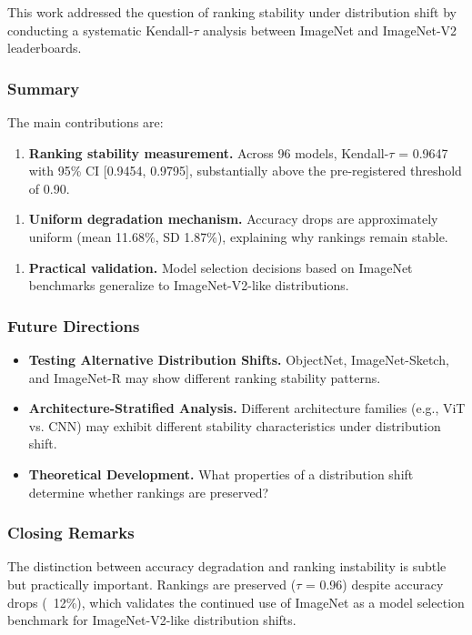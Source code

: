 
This work addressed the question of ranking stability under distribution shift by conducting a systematic Kendall-$\tau$ analysis between ImageNet and ImageNet-V2 leaderboards.

\subsubsection{Summary}

The main contributions are:

\begin{enumerate}
\item \textbf{Ranking stability measurement.} Across 96 models, Kendall-$\tau$ = 0.9647 with 95\% CI [0.9454, 0.9795], substantially above the pre-registered threshold of 0.90.
\end{enumerate}

\begin{enumerate}
\item \textbf{Uniform degradation mechanism.} Accuracy drops are approximately uniform (mean 11.68\%, SD 1.87\%), explaining why rankings remain stable.
\end{enumerate}

\begin{enumerate}
\item \textbf{Practical validation.} Model selection decisions based on ImageNet benchmarks generalize to ImageNet-V2-like distributions.
\end{enumerate}

\subsubsection{Future Directions}

\begin{itemize}
\item \textbf{Testing Alternative Distribution Shifts.} ObjectNet, ImageNet-Sketch, and ImageNet-R may show different ranking stability patterns.
\item \textbf{Architecture-Stratified Analysis.} Different architecture families (e.g., ViT vs. CNN) may exhibit different stability characteristics under distribution shift.
\item \textbf{Theoretical Development.} What properties of a distribution shift determine whether rankings are preserved?
\end{itemize}

\subsubsection{Closing Remarks}

The distinction between accuracy degradation and ranking instability is subtle but practically important. Rankings are preserved ($\tau$ = 0.96) despite accuracy drops (~12\%), which validates the continued use of ImageNet as a model selection benchmark for ImageNet-V2-like distribution shifts.

